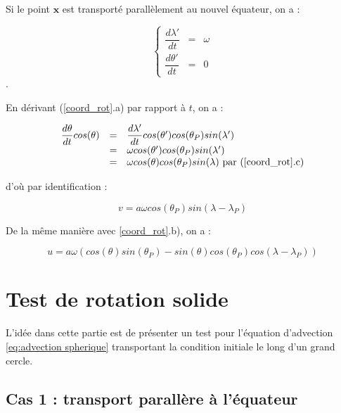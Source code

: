 Si le point $\mathbf{x}$ est transporté parallèlement au nouvel équateur, on a :

\begin{equation}
\left\lbrace 
\begin{array}{rcl}
\dfrac{d \lambda'}{dt} & = & \omega \\
\dfrac{d \theta'}{dt} & = & 0
\end{array}
\right.
\end{equation}.

En dérivant (\ref{coord_rot}.a) par rapport à $t$, on a :

\begin{equation}
\begin{array}{rcl}
\dfrac{d \theta}{dt} cos ( \theta ) & = & \dfrac{d \lambda' }{dt} cos ( \theta' ) cos ( \theta_P) sin( \lambda') \\
 & = & \omega cos ( \theta' ) cos ( \theta_P) sin( \lambda') \\
 & = & \omega cos ( \theta ) cos ( \theta_P) sin( \lambda) \text{ par (\ref{coord_rot}.c)}\\
\end{array}
\end{equation}

d'où par identification :

\begin{equation}
\label{vitesse_solide_v}
v = a \omega cos ( \theta_P ) sin( \lambda - \lambda_P )
\end{equation}

De la même manière avec \ref{coord_rot}.b), on a :

\begin{equation}
\label{vitesse_solide_u}
u = a  \omega \left( cos ( \theta ) sin( \theta_P) - sin( \theta ) cos( \theta_P) cos( \lambda - \lambda_P) \right)
\end{equation}

\section{Test de rotation solide}

L'idée dans cette partie est de présenter un test pour l'équation d'advection \eqref{eq:advection spherique} transportant la condition initiale le long d'un grand cercle.

\subsection{Cas 1 : transport parallère à l'équateur}

